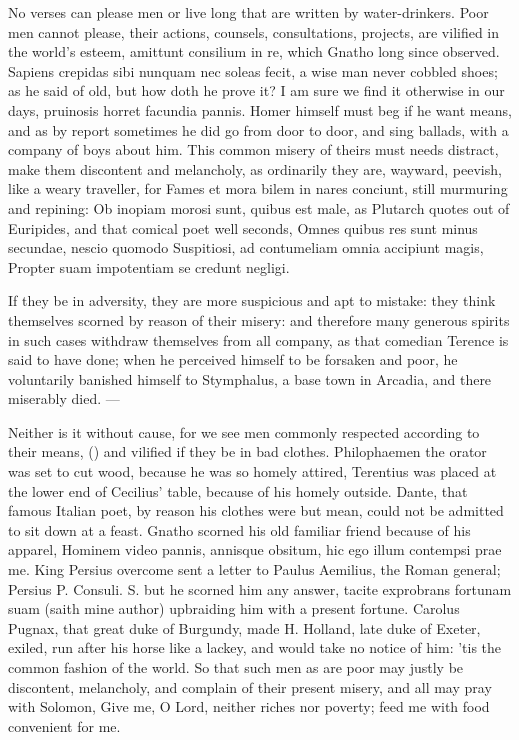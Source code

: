 {No verses can please men or live long that are written by
water-drinkers. Poor men cannot please, their actions, counsels,
consultations, projects, are vilified in the world's esteem, amittunt
consilium in re, which Gnatho long since observed. Sapiens
crepidas sibi nunquam nec soleas fecit, a wise man never cobbled shoes;
as he said of old, but how doth he prove it? I am sure we find it
otherwise in our days,  pruinosis horret facundia pannis. Homer
himself must beg if he want means, and as by report sometimes he did
go from door to door, and sing ballads, with a company of boys
about him. This common misery of theirs must needs distract, make them
discontent and melancholy, as ordinarily they are, wayward, peevish,
like a weary traveller, for  Fames et mora bilem in nares
conciunt, still murmuring and repining: Ob inopiam morosi sunt, quibus
est male, as Plutarch quotes out of Euripides, and that comical poet
well seconds,
Omnes quibus res sunt minus secundae, nescio quomodo
Suspitiosi, ad contumeliam omnia accipiunt magis,
Propter suam impotentiam se credunt negligi.

If they be in adversity, they are more suspicious and apt to mistake:
they think themselves scorned by reason of their misery: and therefore
many generous spirits in such cases withdraw themselves from all
company, as that comedian Terence is said to have done; when he
perceived himself to be forsaken and poor, he voluntarily banished
himself to Stymphalus, a base town in Arcadia, and there miserably
died.
---

Neither is it without cause, for we see men commonly respected
according to their means, () and vilified if they be in bad clothes. Philophaemen the
orator was set to cut wood, because he was so homely attired,
Terentius was placed at the lower end of Cecilius' table, because
of his homely outside.  Dante, that famous Italian poet, by
reason his clothes were but mean, could not be admitted to sit down at
a feast. Gnatho scorned his old familiar friend because of his apparel,
Hominem video pannis, annisque obsitum, hic ego illum contempsi
prae me. King Persius overcome sent a letter to Paulus Aemilius,
the Roman general; Persius P. Consuli. S. but he scorned him any
answer, tacite exprobrans fortunam suam (saith mine author) upbraiding
him with a present fortune. Carolus Pugnax, that great duke of
Burgundy, made H. Holland, late duke of Exeter, exiled, run after his
horse like a lackey, and would take no notice of him:  'tis the
common fashion of the world. So that such men as are poor may justly be
discontent, melancholy, and complain of their present misery, and all
may pray with Solomon, Give me, O Lord, neither riches nor
poverty; feed me with food convenient for me.

}
